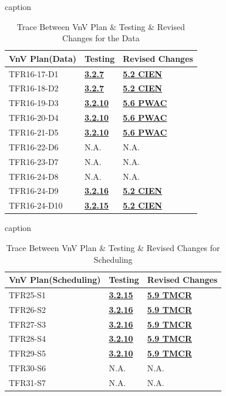 \documentclass[12pt, titlepage]{article}
\begin{document}
\begin{table}[H]
\centering
\caption{caption}
\begin{tabular}{p{} p{} p{}}
\toprule
\textbf{VnV Plan(Data)} & \textbf{Testing} & \textbf{Revised Changes}\\
\midrule
TFR16-17-D1 & \hyperref[3.2.7]{\textbf{3.2.7}} & \hyperref[CIEN]{\textbf{5.2 CIEN}}\\
TFR16-18-D2 & \hyperref[3.2.7]{\textbf{3.2.7}} & \hyperref[CIEN]{\textbf{5.2 CIEN}}\\
TFR16-19-D3 & \hyperref[3.2.10]{\textbf{3.2.10}} & \hyperref[PWAC]{\textbf{5.6 PWAC}}\\
TFR16-20-D4 & \hyperref[3.2.10]{\textbf{3.2.10}} & \hyperref[PWAC]{\textbf{5.6 PWAC}}\\
TFR16-21-D5 & \hyperref[3.2.10]{\textbf{3.2.10}} & \hyperref[PWAC]{\textbf{5.6 PWAC}}\\
TFR16-22-D6 & N.A. & N.A.\\
TFR16-23-D7 & N.A. & N.A.\\
TFR16-24-D8 & N.A. & N.A.\\
TFR16-24-D9 & \hyperref[3.2.16]{\textbf{3.2.16}} & \hyperref[CIEN]{\textbf{5.2 CIEN}}\\
TFR16-24-D10 & \hyperref[3.2.15]{\textbf{3.2.15}} & \hyperref[CIEN]{\textbf{5.2 CIEN}}\\
\bottomrule
\end{tabular}
\caption{Trace Between VnV Plan \& Testing \& Revised Changes for the Data}
\label{TblRT}
\end{table}


\begin{table}[H]
\centering
\caption{caption}
\begin{tabular}{p{} p{} p{}}
\toprule
\textbf{VnV Plan(Scheduling)} & \textbf{Testing} & \textbf{Revised Changes}\\
\midrule
TFR25-S1 & \hyperref[3.2.15]{\textbf{3.2.15}} & \hyperref[TMCR]{\textbf{5.9 TMCR}}\\
TFR26-S2 & \hyperref[3.2.16]{\textbf{3.2.16}} & \hyperref[TMCR]{\textbf{5.9 TMCR}}\\
TFR27-S3 & \hyperref[3.2.16]{\textbf{3.2.16}} & \hyperref[TMCR]{\textbf{5.9 TMCR}}\\
TFR28-S4 & \hyperref[3.2.10]{\textbf{3.2.10}} & \hyperref[TMCR]{\textbf{5.9 TMCR}}\\
TFR29-S5 & \hyperref[3.2.10]{\textbf{3.2.10}} & \hyperref[TMCR]{\textbf{5.9 TMCR}}\\
TFR30-S6 & N.A. & N.A. \\
TFR31-S7 & N.A. & N.A.\\
\bottomrule
\end{tabular}
\caption{Trace Between VnV Plan \& Testing \& Revised Changes for Scheduling}
\label{TblRT}
\end{table}
\end{document}
